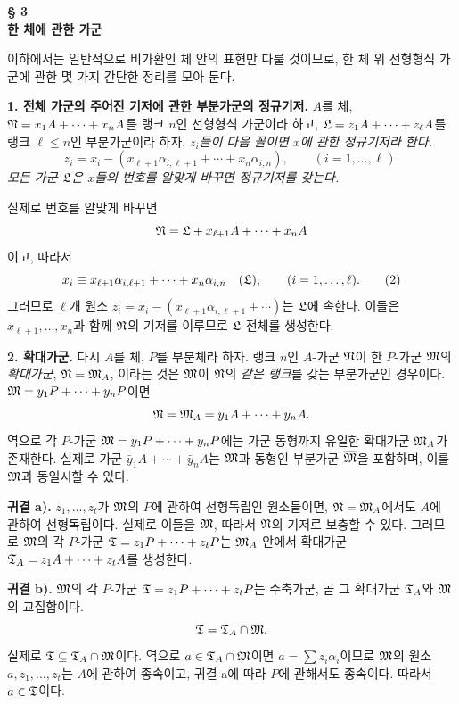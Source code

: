 \begin{center}
\textbf{§ 3}\\[0.4em]
\textbf{한 체에 관한 가군}
\end{center}

이하에서는 일반적으로 비가환인 체 안의 표현만 다룰 것이므로, 한 체 위 선형형식 가군에 관한 몇 가지 간단한 정리를 모아 둔다.

\noindent\textbf{1. 전체 가군의 주어진 기저에 관한 부분가군의 정규기저.} \(A\)를 체, \(\mathfrak N=x_1A+\cdots+x_nA\)를 랭크 \(n\)인 선형형식 가군이라 하고, \(\mathfrak L=z_1A+\cdots+z_\ell A\)를 랭크 \(\ell\le n\)인 부분가군이라 하자. \emph{\(z_i\)들이 다음 꼴이면 \(x\)에 관한 정규기저라 한다.}
\[
z_i=x_i-(x_{\ell+1}\alpha_{i,\ell+1}+\cdots+x_n\alpha_{i,n}),
\qquad(i=1,\ldots,\ell).
\]
\emph{모든 가군 \(\mathfrak L\)은 \(x\)들의 번호를 알맞게 바꾸면 정규기저를 갖는다.}

실제로 번호를 알맞게 바꾸면
\[
\mathfrak N=\mathfrak L+x_{\ell+1}A+\cdots+x_nA
\]
이고, 따라서
\[
x_i\equiv x_{\ell+1}\alpha_{i,\ell+1}+\cdots+x_n\alpha_{i,n}
\quad(\mathfrak L),\qquad(i=1,\ldots,\ell). \tag{2}
\]
그러므로 \(\ell\)개 원소 \(z_i=x_i-(x_{\ell+1}\alpha_{i,\ell+1}+\cdots)\)는 \(\mathfrak L\)에 속한다. 이들은 \(x_{\ell+1},\ldots,x_n\)과 함께 \(\mathfrak N\)의 기저를 이루므로 \(\mathfrak L\) 전체를 생성한다.

\noindent\textbf{2. 확대가군.} 다시 \(A\)를 체, \(P\)를 부분체라 하자. 랭크 \(n\)인 \(A\)-가군 \(\mathfrak N\)이 한 \(P\)-가군 \(\mathfrak M\)의 \emph{확대가군}, \(\mathfrak N=\mathfrak M_A\), 이라는 것은 \(\mathfrak M\)이 \(\mathfrak N\)의 \emph{같은 랭크}를 갖는 부분가군인 경우이다. \(\mathfrak M=y_1P+\cdots+y_nP\)이면
\[
\mathfrak N=\mathfrak M_A=y_1A+\cdots+y_nA.
\]
역으로 각 \(P\)-가군 \(\mathfrak M=y_1P+\cdots+y_nP\)에는 가군 동형까지 유일한 확대가군 \(\mathfrak M_A\)가 존재한다. 실제로 가군 \(\bar y_1A+\cdots+\bar y_nA\)는 \(\mathfrak M\)과 동형인 부분가군 \(\overline{\mathfrak M}\)을 포함하며, 이를 \(\mathfrak M\)과 동일시할 수 있다.

\noindent\textbf{귀결 a).} \(z_1,\ldots,z_t\)가 \(\mathfrak M\)의 \(P\)에 관하여 선형독립인 원소들이면, \(\mathfrak N=\mathfrak M_A\)에서도 \(A\)에 관하여 선형독립이다. 실제로 이들을 \(\mathfrak M\), 따라서 \(\mathfrak N\)의 기저로 보충할 수 있다. 그러므로 \(\mathfrak M\)의 각 \(P\)-가군 \(\mathfrak T=z_1P+\cdots+z_tP\)는 \(\mathfrak M_A\) 안에서 확대가군 \(\mathfrak T_A=z_1A+\cdots+z_tA\)를 생성한다.

\noindent\textbf{귀결 b).} \(\mathfrak M\)의 각 \(P\)-가군 \(\mathfrak T=z_1P+\cdots+z_tP\)는 수축가군, 곧 그 확대가군 \(\mathfrak T_A\)와 \(\mathfrak M\)의 교집합이다.
\[
\mathfrak T=\mathfrak T_A\cap\mathfrak M.
\]
실제로 \(\mathfrak T\subseteq\mathfrak T_A\cap\mathfrak M\)이다. 역으로 \(a\in\mathfrak T_A\cap\mathfrak M\)이면 \(a=\sum z_i\alpha_i\)이므로 \(\mathfrak M\)의 원소 \(a,z_1,\ldots,z_t\)는 \(A\)에 관하여 종속이고, 귀결 a에 따라 \(P\)에 관해서도 종속이다. 따라서 \(a\in\mathfrak T\)이다.


